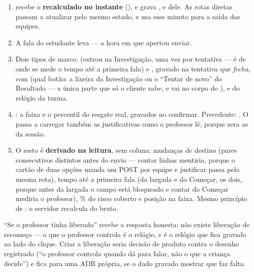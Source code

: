 \begin{enumerate}
  \item {} recebe o  \textbf{recalculado no
    instante} (), e grava ,
     e  dele. As rotas diretas
    passam a atualizar  pelo mesmo estado, e
     usa esse minuto para a saída das equipes.
  \item A fala do estudante leva  --- a hora em que apertou
    enviar.
  \item Dois tipos de marco:  (entrou na Investigação, uma vez por
    tentativa --- é de onde se mede o tempo até a primeira fala) e
    , gravado na tentativa que \emph{fecha}, com 
    (qual botão: a lixeira da Investigação ou o \enquote{Tentar de novo} do
    Resultado --- a única parte que só o cliente sabe, e vai no corpo do
    ),  e  do relógio da turma.
  \item {}: a faixa e o percentil do resgate
    real, gravados no confirmar. Precedente: .
    O  passa a carregar também as justificativas como o professor lê,
    porque  zera as da sessão.
  \item O resto é \textbf{derivado na leitura}, sem coluna: mudanças de destino
    (pares  consecutivos distintos antes do envio --- contar
    linhas mentiria, porque o cartão de duas opções manda um POST por equipe e
    justificar passa pela mesma rota), tempo até a primeira fala (da largada e
    do Começar, os dois, porque antes da largada o campo está bloqueado e
    contar do Começar mediria o professor), \% do risco coberto e posição na
    faixa. Mesmo princípio de : o servidor recalcula do bruto.
\end{enumerate}

\enquote{Se o professor tinha liberado} recebe a resposta honesta: não existe
liberação de recomeço --- o que o professor controla é o relógio, e é o
relógio que fica gravado ao lado do clique. Criar a liberação seria decisão de
produto contra o desenho registrado (\enquote{o professor controla quando dá
para falar, não o que a criança decide}) e fica para uma ADR própria, se o dado
gravado mostrar que faz falta.

